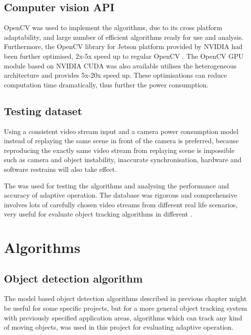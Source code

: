\subsection{Computer vision API}

OpenCV \cite{opencv} was used to implement the algorithms, due to its cross platform adaptability,  and large number of efficient algorithms ready for use and analysis. Furthermore, the OpenCV library for Jetson platform provided by NVIDIA had been further optimised,  2x-5x speed up  to regular OpenCV \cite{NVIDIA:perf}. The OpenCV GPU module based on NVIDIA CUDA was also available utilises the heterogeneous architecture and provides 5x-20x speed up. These optimisations can reduce computation time dramatically, thus further  the power consumption.

\subsection{Testing dataset}

Using a consistent video stream input and a camera power consumption model instead of replaying the same scene in front of the camera is preferred, because reproducing the exactly same video stream from replaying scene is impossible such as camera and object instability, inaccurate synchronisation, hardware and software restrains will also take effect.

The  \cite{goyette2012changedetection} was used for testing the algorithms and analysing the performance and accuracy of adaptive operation. The database was rigorous and comprehensive involves lots of carefully chosen video streams from different real life scenarios,  very useful for evaluate object tracking algorithms in different .

\section{Algorithms}

\subsection{Object detection algorithm}

The model based object detection algorithms described in previous chapter might be useful for some specific projects, but for a more general object tracking system with previously specified application areas,  algorithms which can track any kind of moving objects, was used in this project for evaluating adaptive operation.

